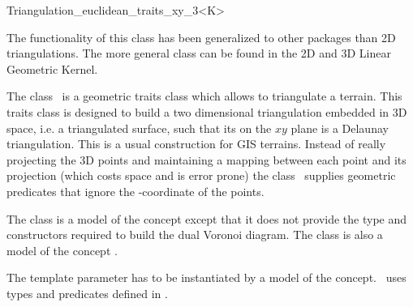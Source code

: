 

\begin{ccRefClass}{Triangulation_euclidean_traits_xy_3<K>}  %

\begin{ccDeprecated}
The functionality of this class has been generalized to other packages than 2D triangulations.
The more general class  can be found in the 2D and 3D Linear Geometric Kernel.
\end{ccDeprecated}

\ccDefinition
  
The class \ccRefName\ is a geometric traits class which allows to
triangulate
a terrain. This traits class is designed to build 
a two dimensional triangulation  embedded in 3D space,
i.e. a triangulated surface, such that 
its
on the $xy$ plane  is a Delaunay triangulation.
This is a usual construction for GIS terrains.
Instead of really projecting the 3D points and
maintaining a mapping between each point and its projection
 (which costs space and is error prone)
the class \ccRefName\  supplies geometric predicates that ignore the
-coordinate of the points.

The class is a model of the concept  
except that it does not provide the type and constructors
required to build the dual Voronoi diagram. The class is also a model
of the concept .

\ccParameters
The template parameter   has to
be instantiated by a model of the  concept.
\ccRefName\ uses types 
and predicates defined in .


\ccTypes
{}
\ccGlue
{}
\ccGlue
{}
\ccGlue
{}


\end{ccRefClass}
